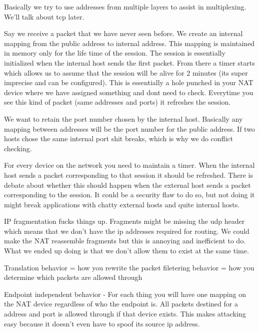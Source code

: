 \documentclass[12pt]{article}
\begin{document}
  
  
  
  
Basically we try to use addresses from multiple layers to assist in multiplexing. We'll talk about tcp later.

Say we receive a packet that we have never seen before. We create an internal mapping from the public address to internal address. This mapping is maintained in memory only for the life time of the session. The session is essentially initialized when the internal host sends the first packet. From there a timer starts which allows us to assume that the session will be alive for 2 minutes (its super imprecise and can be configured). This is essentially a hole punched in your NAT device where we have assigned something and dont need to check. Everytime you see this kind of packet (same addresses and ports) it refreshes the session.

We want to retain the port number chosen by the internal host. Basically any mapping between addresses will be the port number for the public address. If two hosts chose the same internal port shit breaks, which is why we do conflict checking.

  
For every device on the network you need to maintain a timer. When the internal host sends a packet corresponding to that session it should be refreshed. There is debate about whether this should happen when the external host sends a packet corresponding to the session. It could be a security flaw to do so, but not doing it might break applications with chatty external hosts and quite internal hosts.

  
IP fragmentation fucks things up. Fragments might be missing the udp header which means that we don't have the ip addresses required for routing. We could make the NAT reassemble fragments but this is annoying and inefficient to do. What we ended up doing is that we don't allow them to exist at the same time. 

  

Translation behavior = how you rewrite the packet  filetering behavior = how you determine which packets are allowed through

Endpoint independent behavior - For each thing you will have one mapping on the NAT device regardless of who the endpoint is. All packets destined for a address and port is allowed through if that device exists. This makes attacking easy because it doesn't even have to spoof its source ip address.
\end{document}
